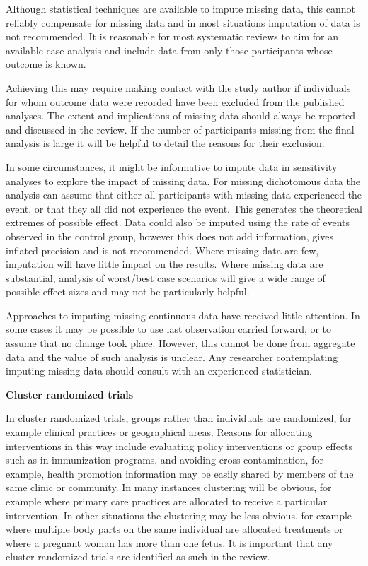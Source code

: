 \documentclass[
  11pt,
  a4paper,
  DIV=11,
  numbers=noendperiod]{scrreprt}
\begin{document}
Although statistical techniques are available to impute missing data,
this cannot reliably compensate for missing data and in most situations
imputation of data is not recommended. It is reasonable for most
systematic reviews to aim for an available case analysis and include
data from only those participants whose outcome is known.

Achieving this may require making contact with the study author if
individuals for whom outcome data were recorded have been excluded from
the published analyses. The extent and implications of missing data
should always be reported and discussed in the review. If the number of
participants missing from the final analysis is large it will be helpful
to detail the reasons for their exclusion.

In some circumstances, it might be informative to impute data in
sensitivity analyses to explore the impact of missing data. For missing
dichotomous data the analysis can assume that either all participants
with missing data experienced the event, or that they all did not
experience the event. This generates the theoretical extremes of
possible effect. Data could also be imputed using the rate of events
observed in the control group, however this does not add information,
gives inflated precision and is not recommended. Where missing data are
few, imputation will have little impact on the results. Where missing
data are substantial, analysis of worst/best case scenarios will give a
wide range of possible effect sizes and may not be particularly helpful.

Approaches to imputing missing continuous data have received little
attention. In some cases it may be possible to use last observation
carried forward, or to assume that no change took place. However, this
cannot be done from aggregate data and the value of such analysis is
unclear. Any researcher contemplating imputing missing data should
consult with an experienced statistician.

\textbf{Cluster randomized trials}

In cluster randomized trials, groups rather than individuals are
randomized, for example clinical practices or geographical areas.
Reasons for allocating interventions in this way include evaluating
policy interventions or group effects such as in immunization programs,
and avoiding cross-contamination, for example, health promotion
information may be easily shared by members of the same clinic or
community. In many instances clustering will be obvious, for example
where primary care practices are allocated to receive a particular
intervention. In other situations the clustering may be less obvious,
for example where multiple body parts on the same individual are
allocated treatments or where a pregnant woman has more than one fetus.
It is important that any cluster randomized trials are identified as
such in the review.
\end{document}
